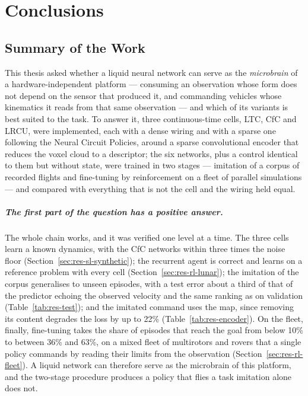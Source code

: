 \chapter{Conclusions}
\label{ch:conclusions}

\section{Summary of the Work}
\label{sec:conclusions-summary}

This thesis asked whether a liquid neural network can serve as the
\emph{microbrain} of a hardware-independent platform --- consuming an
observation whose form does not depend on the sensor that produced it, and
commanding vehicles whose kinematics it reads from that same observation ---
and which of its variants is best suited to the task. To answer it, three
continuous-time cells, LTC, CfC and LRCU, were implemented, each with a dense
wiring and with a sparse one following the Neural Circuit Policies, around a
sparse convolutional encoder that reduces the voxel cloud to a descriptor; the
six networks, plus a control identical to them but without state, were trained
in two stages --- imitation of a corpus of recorded flights and fine-tuning by
reinforcement on a fleet of parallel simulations --- and compared with
everything that is not the cell and the wiring held equal.

\paragraph{The first part of the question has a positive answer.}
The whole chain works, and it was verified one level at a time. The three cells
learn a known dynamics, with the CfC networks within three times the noise
floor (Section~\ref{sec:res-sl-synthetic}); the recurrent agent is correct and
learns on a reference problem with every cell (Section~\ref{sec:res-rl-lunar});
the imitation of the corpus generalises to unseen episodes, with a test error
about a third of that of the predictor echoing the observed velocity and the
same ranking as on validation (Table~\ref{tab:res-test}); and the imitated
command uses the map, since removing its content degrades the loss by up to
22\% (Table~\ref{tab:res-encoder}). On the fleet, finally, fine-tuning takes the
share of episodes that reach the goal from below 10\% to between 36\% and 63\%,
on a mixed fleet of multirotors and rovers that a single policy commands by
reading their limits from the observation (Section~\ref{sec:res-rl-fleet}). A
liquid network can therefore serve as the microbrain of this platform, and the
two-stage procedure produces a policy that flies a task imitation alone does
not.

